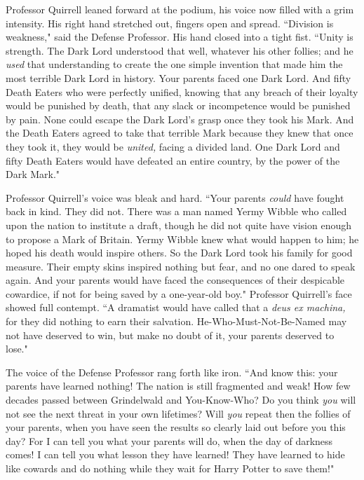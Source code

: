 Professor Quirrell leaned forward at the podium, his voice now filled with a grim intensity. His right hand stretched out, fingers open and spread. ``Division is weakness," said the Defense Professor. His hand closed into a tight fist. ``Unity is strength. The Dark Lord understood that well, whatever his other follies; and he \emph{used} that understanding to create the one simple invention that made him the most terrible Dark Lord in history. Your parents faced one Dark Lord. And fifty Death Eaters who were perfectly unified, knowing that any breach of their loyalty would be punished by death, that any slack or incompetence would be punished by pain. None could escape the Dark Lord's grasp once they took his Mark. And the Death Eaters agreed to take that terrible Mark because they knew that once they took it, they would be \emph{united,} facing a divided land. One Dark Lord and fifty Death Eaters would have defeated an entire country, by the power of the Dark Mark."

Professor Quirrell's voice was bleak and hard. ``Your parents \emph{could} have fought back in kind. They did not. There was a man named Yermy Wibble who called upon the nation to institute a draft, though he did not quite have vision enough to propose a Mark of Britain. Yermy Wibble knew what would happen to him; he hoped his death would inspire others. So the Dark Lord took his family for good measure. Their empty skins inspired nothing but fear, and no one dared to speak again. And your parents would have faced the consequences of their despicable cowardice, if not for being saved by a one-year-old boy." Professor Quirrell's face showed full contempt. ``A dramatist would have called that a \emph{deus ex machina,} for they did nothing to earn their salvation. He-Who-Must-Not-Be-Named may not have deserved to win, but make no doubt of it, your parents deserved to lose."

The voice of the Defense Professor rang forth like iron. ``And know this: your parents have learned nothing! The nation is still fragmented and weak! How few decades passed between Grindelwald and You-Know-Who? Do you think \emph{you} will not see the next threat in your own lifetimes? Will \emph{you} repeat then the follies of your parents, when you have seen the results so clearly laid out before you this day? For I can tell you what your parents will do, when the day of darkness comes! I can tell you what lesson they have learned! They have learned to hide like cowards and do nothing while they wait for Harry Potter to save them!"

